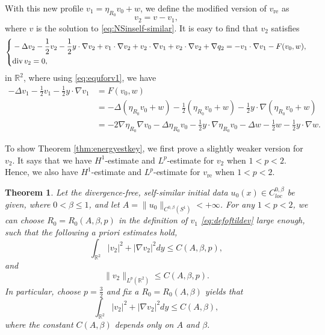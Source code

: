 \documentclass[12pt]{amsart}
\renewcommand{\div}{{\rm div \thinspace }}
\numberwithin{equation}{section}              %
\newtheorem{theorem}{Theorem}[section]
\theoremstyle{remark}
\begin{document}
		With this new profile $v_1= \eta_{R_0}	 v_0 +w$, we define the modified version of $v_{\textrm{re}}$ as
		\begin{equation}\label{eq:modre}
			v_{2}=v- v_1,
		\end{equation}
		where $v$ is the solution to \eqref{eq:NSinself-similar}.
		It is easy to find that $v_2$ satisfies
		\begin{equation}\label{eq:eqfordiff}
			\left\{
			\begin{aligned}
				&-\Delta v_2 -\frac{1}{2}v_2 -\frac{1}{2}y\cdot \nabla v_2+  v_1\cdot \nabla v_2 + v_2\cdot \nabla  v_1+v_2\cdot \nabla v_2 +\nabla q_2=- v_1\cdot\nabla  v_1 - F(v_0,w),\\
				&  \div v_2=0,		
			\end{aligned}		
			\right.
		\end{equation}
        in $\mathbb{R}^2$, 
		where using \eqref{eq:equforv1}, we have
		\begin{equation}\label{eq:eqformodifv}
			\begin{aligned}
					-\Delta  v_1 -\frac{1}{2} v_1 -\frac{1}{2}y\cdot \nabla  v_1 & = F(v_0,w) \\
				&	=  	-\Delta (\eta_{R_0}	v_0 +w )- \frac{1}{2}(\eta_{R_0}	v_0 +w ) -\frac{1}{2}y\cdot \nabla (\eta_{R_0}	v_0 +w )\\
				&= - 2 \nabla \eta_{R_0}\nabla 	v_0- \Delta \eta_{R_0}	v_0   -\frac{1}{2}y\cdot \nabla \eta_{R_0}	 v_0 -\Delta w  -\frac{1}{2} w -\frac{1}{2}y\cdot \nabla  w.
			\end{aligned}
		\end{equation}

		
		To show Theorem \ref{thm:energyestkey}, we first prove a slightly weaker version for $v_2$. It  says that we have $H^1$-estimate and $L^{p}$-estimate for  $v_2$  when $1<p<2 $.  Hence, we also have $H^1$-estimate and  $L^{p}$-estimate for  $v_{\text{re}}$ when $1<p<2 $.
		\begin{theorem}\label{thm:energyest}
        Let the divergence-free, self-similar initial data $u_0(x)\in C^{0,\beta}_{loc}$ be given, where $0<\beta\leq 1$, and let
			$A=\|u_0\|_{C^{0,\beta}(S^1)}<+\infty$.		
			For any $1<p<2 $, we can  choose
			$R_0=R_0(A,\beta, p)$ in the definition of $v_1$  \eqref{eq:defoftildev} large enough, such that 
     the following a priori estimates  hold,
			\begin{equation*}
				\int_{\mathbb{R}^2} |v_2|^2 + |\nabla v_2|^2 dy \leq C(A,\beta, p),
			\end{equation*}
			and 
			\begin{equation*}
				\|v_2\|_{L^{p}(\mathbb{R}^2)} \leq C(A, \beta, p).
			\end{equation*}
			In particular, choose $p=\frac{3}{2}$ and fix a $R_0=R_0(A,\beta)$ 
            yields that  
			\begin{equation*}
				\int_{\mathbb{R}^2} |v_2|^2 + |\nabla v_2|^2 dy \leq C(A, \beta),
			\end{equation*}
          where the constant $C(A, \beta)$ depends only on $A$ and $\beta$.
		\end{theorem}
		
\end{document}
